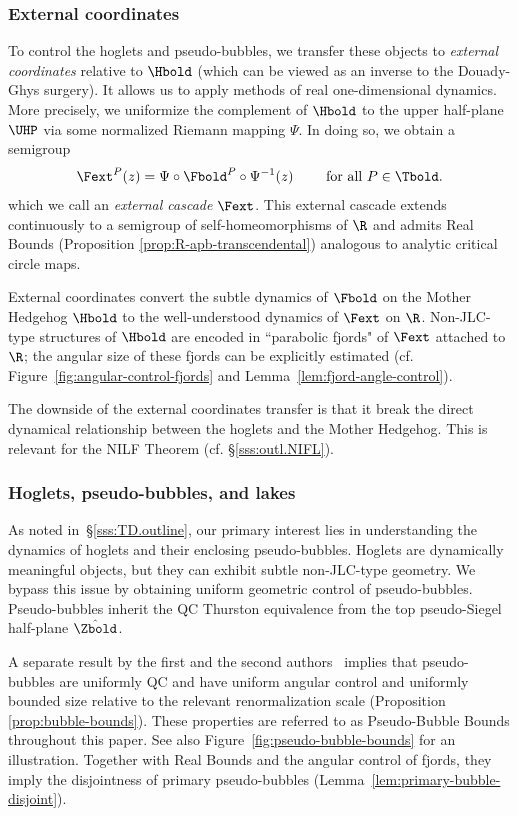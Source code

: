 \documentclass{amsart}
\begin{document}
\subsubsection{External coordinates}\label{sss:outl.extern.coord}
To control the hoglets and pseudo-bubbles, 
we transfer these objects to \emph{external coordinates} relative to $\Hbold$
(which can be viewed as an inverse to the Douady-Ghys surgery).
It allows us to apply methods of real one-dimensional dynamics.
More precisely, we uniformize the complement of $\Hbold$ to the upper half-plane $\UHP$ via some normalized Riemann mapping $\Psi$.
In doing so, we obtain a semigroup
\[
    \Fext^{P}(z) = \Psi \circ \Fbold^{P} \circ \Psi^{-1}(z) \qquad \text{ for all } P \in \Tbold.
\]
which we call an \emph{external cascade} $\Fext$.
This external cascade extends continuously to a semigroup of self-homeomorphisms of $\R$ and admits Real Bounds (Proposition \ref{prop:R-apb-transcendental}) analogous to analytic critical circle maps.

External coordinates convert the subtle dynamics of $\Fbold$ on the Mother Hedgehog $\Hbold$ to the well-understood dynamics of $\Fext$ on $\R$. Non-JLC-type structures of $\Hbold$ are encoded in ``parabolic fjords" of $\Fext$ attached to  $\R$; 
the angular size of these fjords can be explicitly estimated 
(cf. Figure~\ref{fig:angular-control-fjords} and  Lemma~\ref{lem:fjord-angle-control}).

The downside of the  external coordinates transfer 
is that it break the direct dynamical relationship between the hoglets and the Mother Hedgehog. This is relevant for the NILF Theorem (cf. \S\ref{sss:outl.NIFL}). 

\subsubsection{Hoglets, pseudo-bubbles, and lakes}\label{sss:outl.lakes} As noted in~\S\ref{sss:TD.outline}, our primary interest lies in understanding the dynamics of hoglets and their enclosing pseudo-bubbles. Hoglets are dynamically meaningful objects, but they can exhibit subtle non-JLC-type geometry. We bypass this issue by obtaining uniform geometric control of pseudo-bubbles. Pseudo-bubbles inherit the QC Thurston equivalence from the top pseudo-Siegel half-plane $\hat{\Zbold}$. 

A separate result by the first and the second authors~\cite{DLi26} implies that pseudo-bubbles are uniformly QC and have uniform angular control and uniformly bounded size relative to the relevant renormalization scale (Proposition \ref{prop:bubble-bounds}). 
These properties are referred to as Pseudo-Bubble Bounds throughout this paper. 
See also Figure~\ref{fig:pseudo-bubble-bounds} for an illustration. 
Together with Real Bounds and the angular control of fjords, they imply the disjointness of primary pseudo-bubbles (Lemma~\ref{lem:primary-bubble-disjoint}).
\end{document}
